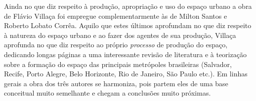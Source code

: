 
Ainda no que diz respeito à produção, apropriação e uso do espaço urbano a obra de Flávio Villaça \cite{villaca_intraurbano_2017} foi empregue complementarmente às de Milton Santos e Roberto Lobato Corrêa. Aquilo que estes últimos aprofundam no que diz respeito à natureza do espaço urbano e ao fazer dos agentes de sua produção, Villaça aprofunda no que diz respeito ao próprio \textit{processo} de produção do espaço, dedicando longas páginas a uma interessante revisão de literatura e à teorização sobre a formação do espaço das principais metrópoles brasileiras (Salvador, Recife, Porto Alegre, Belo Horizonte, Rio de Janeiro, São Paulo etc.). Em linhas gerais a obra dos três autores se harmoniza, pois partem eles de uma base conceitual muito semelhante e chegam a conclusões muito próximas.

